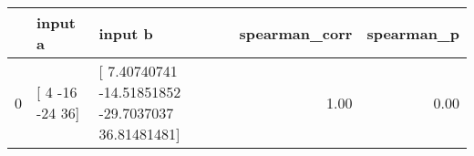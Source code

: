 \begin{tabular}{lllrr}
\toprule
 & input a & input b & spearman\_corr & spearman\_p \\
\midrule
0 & [  4 -16 -24  36] & [  7.40740741 -14.51851852 -29.7037037   36.81481481] & 1.00 & 0.00 \\
\bottomrule
\end{tabular}
